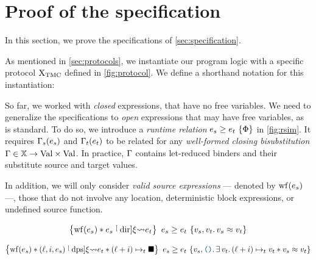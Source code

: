 \section{Proof of the specification}
\label{sec:proof}

In this section, we prove the specifications of \cref{sec:specification}.

As mentioned in \cref{sec:protocols}, we instantiate our program logic with a specific protocol $\mathrm{X}_\mathrm{TMC}$ defined in \cref{fig:protocol}. We define a shorthand notation for this instantiation:
\begin{mathline}
    \coloneqq
\end{mathline}

So far, we worked with \emph{closed} expressions, that have no free variables.
We need to generalize the specifications to \emph{open} expressions that may have free variables, as is standard.
To do so, we introduce a \emph{runtime relation} $\iRsimv{\iPred}{\datalangExpr_s}{\datalangExpr_t}$ in \cref{fig:rsim}.
It requires $\datalangBisubst_s (\datalangExpr_s)$ and $\datalangBisubst_t (\datalangExpr_t)$ to be related for any \emph{well-formed closing bisubstitution} $\datalangBisubst \in \datalangVar[] \rightarrow \datalangVal[] \times \datalangVal[]$.
In practice, $\datalangBisubst$ contains let-reduced binders and their substitute source and target values.

In addition, we will only consider \emph{valid source expressions} --- denoted by $\wf{\datalangExpr_s}$ ---, \ie those that do not involve any location, deterministic block expressions, or undefined source function.

\begin{lemma} \label{thm:dir}
    \[
        \iRsimvHoare{
            \wf{\datalangExpr_s} \iSep
            \datalangExpr_s \tmcDir{\datalangRenaming} \datalangExpr_t
        }{
            \datalangVal_s, \datalangVal_t \ldotp
            \datalangVal_s \iSimilar \datalangVal_t
        }{
            \datalangExpr_s
        }{
            \datalangExpr_t
        }
    \]
\end{lemma}

\begin{lemma} \label{thm:dps}
    \[
        \iRsimvHoare{
            \wf{\datalangExpr_s} \iSep
            (\datalangLoc, \datalangIdx, \datalangExpr_s) \tmcDps{\datalangRenaming} \datalangExpr_t \iSep
            (\datalangLoc + \datalangIdx) \iPointsto_t \datalangHole
        }{
            \datalangVal_s, \datalangUnit \ldotp
            \exists \datalangVal_t \ldotp
            (\datalangLoc + \datalangIdx) \iPointsto_t \datalangVal_t \iSep
            \datalangVal_s \iSimilar \datalangVal_t
        }{
            \datalangExpr_s
        }{
            \datalangExpr_t
        }
    \]
\end{lemma}

